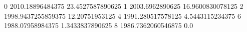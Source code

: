 0 2010.18896484375 23.4527587890625
1 2003.6962890625 16.9600830078125
2 1998.9437255859375 12.20751953125
4 1991.280517578125 4.5443115234375
6 1988.07958984375 1.3433837890625
8 1986.7362060546875 0.0
